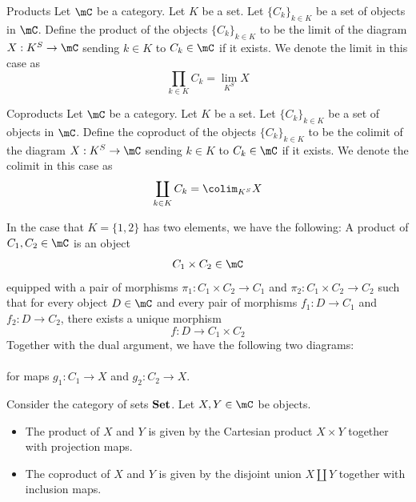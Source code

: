 \documentclass[a4paper]{article}
\begin{document}
\begin{defn}{Products}{} Let $\mC$ be a category. Let $K$ be a set. Let $\{C_k\}_{k\in K}$ be a set of objects in $\mC$. Define the product of the objects $\{C_k\}_{k\in K}$ to be the limit of the diagram $X:K^S\to\mC$ sending $k\in K$ to $C_k\in\mC$ if it exists. We denote the limit in this case as $$\prod_{k\in K}C_k=\lim_{K^S}X$$
\end{defn}

\begin{defn}{Coproducts}{} Let $\mC$ be a category. Let $K$ be a set. Let $\{C_k\}_{k\in K}$ be a set of objects in $\mC$. Define the coproduct of the objects $\{C_k\}_{k\in K}$ to be the colimit of the diagram $X:K^S\to\mC$ sending $k\in K$ to $C_k\in\mC$ if it exists. We denote the colimit in this case as $$\coprod_{k\in K}C_k=\colim_{K^S}X$$
\end{defn}

In the case that $K=\{1,2\}$ has two elements, we have the following: A product of $C_1,C_2\in\mC$ is an object $$C_1\times C_2\in\mC$$ equipped with a pair of morphisms $\pi_1:C_1\times C_2\to C_1$ and $\pi_2:C_1\times C_2\to C_2$ such that for every object $D\in\mC$ and every pair of morphisms $f_1:D\to C_1$ and $f_2:D\to C_2$, there exists a unique morphism $$f:D\to C_1\times C_2$$ Together with the dual argument, we have the following two diagrams: \\
\\
for maps $g_1:C_1\to X$ and $g_2:C_2\to X$. 

\begin{prp}{}{} Consider the category of sets $\bold{Set}$. Let $X,Y\in\mC$ be objects. 
\begin{itemize}
\item The product of $X$ and $Y$ is given by the Cartesian product $X\times Y$ together with projection maps. 
\item The coproduct of $X$ and $Y$ is given by the disjoint union $X\amalg Y$ together with inclusion maps. 
\end{itemize}
\end{prp}
\end{document}
